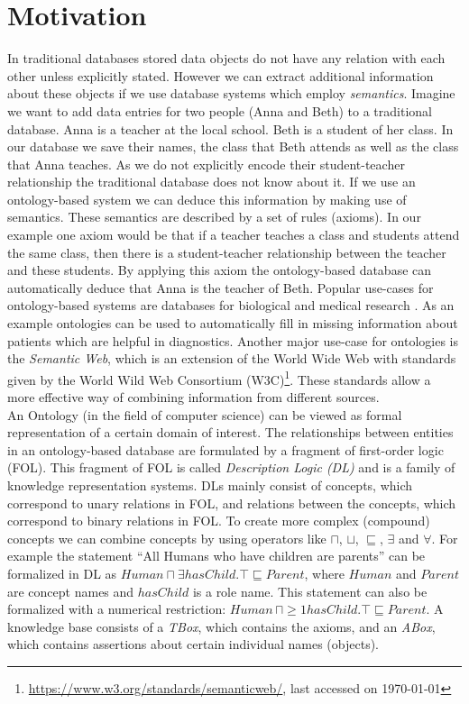 \documentclass{book}
\theoremstyle{break}
\theoremstyle{definition}
\begin{document}
\section{Motivation}
In traditional databases stored data objects do not have any relation with each other unless explicitly stated. However we can extract additional information about these objects if we use database systems which employ \textit{semantics}.
Imagine we want to add data entries for two people (Anna and Beth) to a traditional database. Anna is a teacher at the local school. Beth is a student of her class. In our database we save their names, the class that Beth attends as well as the class that Anna teaches. As we do not explicitly encode their student-teacher relationship the traditional database does not know about it. If we use an ontology-based system we can deduce this information by making use of semantics. These semantics are described by a set of rules (axioms). In our example one axiom would be that if a teacher teaches a class and students attend the same class, then there is a student-teacher relationship between the teacher and these students. By applying this axiom the ontology-based database can automatically deduce that Anna is the teacher of Beth.  
Popular use-cases for ontology-based systems are databases for biological and medical research \cite{bio}. As an example ontologies can be used to automatically fill in missing information about patients which are helpful in diagnostics. Another major use-case for ontologies is the \textit{Semantic Web}, which is an extension of the World Wide Web with standards given by the World Wild Web Consortium (W3C)\footnote{\url{https://www.w3.org/standards/semanticweb/}, last accessed on \today}. These standards allow a more effective way of combining information from different sources.
\\
An Ontology (in the field of computer science) can be viewed as formal representation of a certain domain of interest. The relationships between entities in an ontology-based database are formulated by a fragment of first-order logic (FOL). This fragment of FOL is called \textit{Description Logic (DL)} and is a family of knowledge representation systems. DLs mainly consist of concepts, which correspond to unary relations in FOL, and relations between the concepts, which correspond to binary relations in FOL. To create more complex (compound) concepts we can combine concepts by using operators like $\sqcap$, $\sqcup$, $\sqsubseteq$, $\exists$ and $\forall$. For example the statement ``All Humans who have children are parents'' can be formalized  in DL as $Human\sqcap \exists hasChild.\top \sqsubseteq Parent$, where $Human$ and $Parent$ are concept names and $hasChild$ is a role name. This statement can also be formalized with a numerical restriction: $Human \,\sqcap \geq 1 hasChild.\top\sqsubseteq Parent$. A knowledge base consists of a \textit{TBox}, which contains the axioms, and an \textit{ABox}, which contains assertions about certain individual names (objects). \\ 
\end{document}
